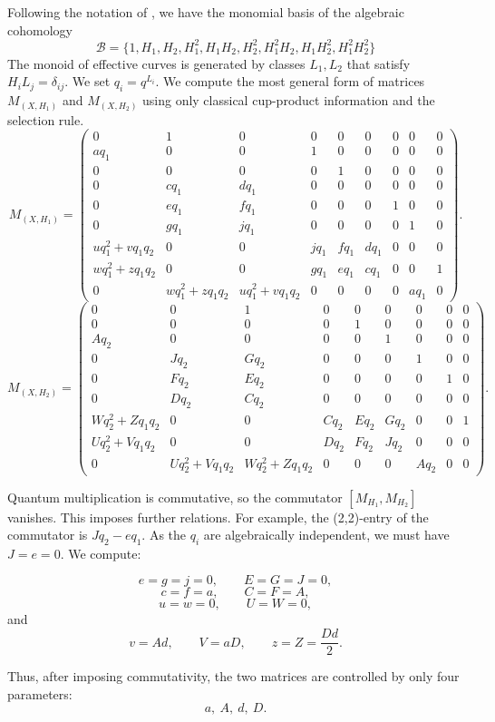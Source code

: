 \documentclass[11pt]{amsart}
\theoremstyle{plain}
\numberwithin{equation}{section}
\theoremstyle{definition}
\theoremstyle{remark}
\begin{document}
Following the notation of \cite{Fay26}, we have the monomial basis of the algebraic cohomology
\[
\mathcal{B} = \{1, H_1, H_2, H_1^2, H_1H_2, H_2^2, H_1^2H_2, H_1H_2^2,H_1^2H_2^2\}
\]
The monoid of effective curves is generated by classes $L_1, L_2$ that satisfy $H_iL_j = \delta_{ij}$. We set $q_i = q^{L_i}$.
We compute the most general form of matrices $M_{(X,H_1)}$ and $M_{(X,H_2)}$ using only classical cup-product information and the selection rule. 
\[
M_{(X,H_1)}
=
\begin{pmatrix}
0&1&0&0&0&0&0&0&0\\
a q_1&0&0&1&0&0&0&0&0\\
0&0&0&0&1&0&0&0&0\\
0&c q_1&d q_1&0&0&0&0&0&0\\
0&e q_1&f q_1&0&0&0&1&0&0\\
0&g q_1&j q_1&0&0&0&0&1&0\\
u q_1^2+v q_1q_2&0&0&j q_1&f q_1&d q_1&0&0&0\\
w q_1^2+z q_1q_2&0&0&g q_1&e q_1&c q_1&0&0&1\\
0&w q_1^2+z q_1q_2&u q_1^2+v q_1q_2&0&0&0&0&a q_1&0
\end{pmatrix}.
\]
\[
M_{(X,H_2)}
=
\begin{pmatrix}
0&0&1&0&0&0&0&0&0\\
0&0&0&0&1&0&0&0&0\\
A q_2&0&0&0&0&1&0&0&0\\
0&J q_2&G q_2&0&0&0&1&0&0\\
0&F q_2&E q_2&0&0&0&0&1&0\\
0&D q_2&C q_2&0&0&0&0&0&0\\
W q_2^2+Z q_1q_2&0&0&C q_2&E q_2&G q_2&0&0&1\\
U q_2^2+V q_1q_2&0&0&D q_2&F q_2&J q_2&0&0&0\\
0&U q_2^2+V q_1q_2&W q_2^2+Z q_1q_2&0&0&0&A q_2&0&0
\end{pmatrix}.
\]

Quantum multiplication is commutative, so the commutator $[M_{H_1}, M_{H_2}]$ vanishes. This imposes further relations. For example, the (2,2)-entry of the commutator is $Jq_2 -eq_1$. As the $q_i$ are algebraically independent, we must have $J= e= 0$. We compute:
 
\[
e=g=j=0,
\qquad
E=G=J=0,
\]
\[
c=f=a,
\qquad
C=F=A,
\]
\[
u=w=0,
\qquad
U=W=0,
\]
and
\[
v=Ad,
\qquad
V=aD,
\qquad
z=Z=\frac{Dd}{2}.
\]

Thus, after imposing commutativity, the two matrices are controlled by only four
parameters:
\[
a,\ A,\ d,\ D.
\]
\end{document}
